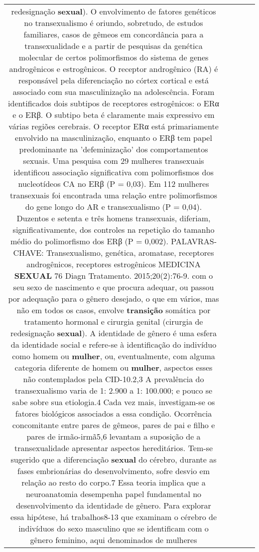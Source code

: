 \documentclass[11pt]{article}
\newlength\mylength
\begin{document}
\begin{center}
\begin{longtable}{|C{.65\mylength}|C{.30\mylength}|C{.12\mylength}|C{.12\mylength}|C{.12\mylength}|}
redesignação \textbf{sexual}).
O envolvimento de fatores genéticos no transexualismo é oriundo, sobretudo, de estudos familiares, casos de gêmeos em concordância para
a transexualidade e a partir de pesquisas da genética molecular de certos polimorfismos do sistema de genes androgênicos e estrogênicos.
O receptor androgênico (RA) é responsável pela diferenciação no córtex cortical e está associado com sua masculinização na adolescência.
Foram identificados dois subtipos de receptores estrogênicos: o ERα e o ERβ. O subtipo beta é claramente mais expressivo em várias regiões cerebrais. O receptor ERα está primariamente envolvido na masculinização, enquanto o ERβ tem papel predominante na 'defeminização' dos comportamentos sexuais.
Uma pesquisa com 29 mulheres transexuais identificou associação significativa com polimorfismos dos nucleotídeos CA no ERβ (P = 0,03).
Em 112 mulheres transexuais foi encontrada uma relação entre polimorfismos do gene longo do AR e transexualismo (P = 0,04).
Duzentos e setenta e três homens transexuais, diferiam, significativamente, dos controles na repetição do tamanho médio do polimorfismo
dos ERβ (P = 0,002).
PALAVRAS-CHAVE: Transexualismo, genética, aromatase, receptores androgênicos, receptores estrogênicos
MEDICINA \textbf{SEXUAL}
76 Diagn Tratamento. 2015;20(2):76-9.
com o seu sexo de nascimento e que procura adequar, ou
passou por adequação para o gênero desejado, o que em vários, mas não em todos os casos, envolve \textbf{transição} somática por tratamento hormonal e cirurgia genital (cirurgia de
redesignação \textbf{sexual}). A identidade de gênero é uma esfera
da identidade social e refere-se à identificação do indivíduo
como homem ou \textbf{mulher}, ou, eventualmente, com alguma
categoria diferente de homem ou \textbf{mulher}, aspectos esses
não contemplados pela CID-10.2,3
A prevalência do transexualismo varia de 1: 2.900 a 1:
100.000; e pouco se sabe sobre sua etiologia.4
 Cada vez
mais, investigam-se os fatores biológicos associados a essa
condição. Ocorrência concomitante entre pares de gêmeos, pares de pai e filho e pares de irmão-irmã5,6 levantam
a suposição de a transexualidade apresentar aspectos hereditários. Tem-se sugerido que a diferenciação \textbf{sexual} do
cérebro, durante as fases embrionárias do desenvolvimento, sofre desvio em relação ao resto do corpo.7
 Essa teoria
implica que a neuroanatomia desempenha papel fundamental no desenvolvimento da identidade de gênero. Para
explorar essa hipótese, há trabalhos8-13 que examinam o cérebro de indivíduos do sexo masculino que se identificam
com o gênero feminino, aqui denominados de mulheres

\end{longtable}
\end{center}
\end{document}
